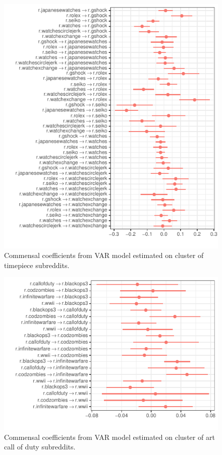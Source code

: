 \documentclass[manuscript]{acmart}\usepackage[]{graphicx}\usepackage[]{color}
\makeatletter
\def\maxwidth{ %
  \ifdim\Gin@nat@width>\linewidth
    \linewidth
  \else
    \Gin@nat@width
  \fi
}
\makeatother
\begin{document}
\begin{figure}
\centering

\includegraphics[width=\maxwidth]{figures/knitr-mixed_coefs-1} 

\caption{Commensal coefficients from VAR model estimated on cluster of timepiece subreddits. \label{mixed.coefs}}
\end{figure}

\begin{figure}
\centering

\includegraphics[width=\maxwidth]{figures/knitr-void_coefs-1} 

\caption{Commensal coefficients from VAR model estimated on cluster of art call of duty subreddits. \label{diet.coefs}}
\end{figure}
\end{document}
